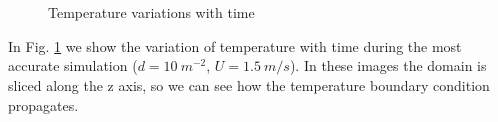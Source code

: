 \begin{figure}[!h]
\centering
\subfloat[t = 25 s]
{\label{fig:0701}%
\texttt{[image: 0701]}} \quad 
\subfloat[t = 150 s]
{\label{fig:0806}%
\texttt{[image: 0806]}} \quad  
\subfloat[t = 300 s]
{\label{fig:0912}%
\texttt{[image: 0912]}} \\  
\subfloat[t = 450 s]
{\label{fig:1018}%
\texttt{[image: 1018]}} \quad  
\subfloat[t = 600 s]
{\label{fig:1124}%
\texttt{[image: 1124]}} \\  
\caption[Temperature variations with time]{Temperature variations with time}
\label{fig:simulations2}
\end{figure}

In Fig. \ref{fig:simulations2} we show the variation of temperature with time
during the most accurate simulation ($d = 10 ~m^{-2}$, $U = 1.5
~m/s$).
In these images the domain is sliced along the z axis, so we can see how the
temperature boundary condition propagates.
